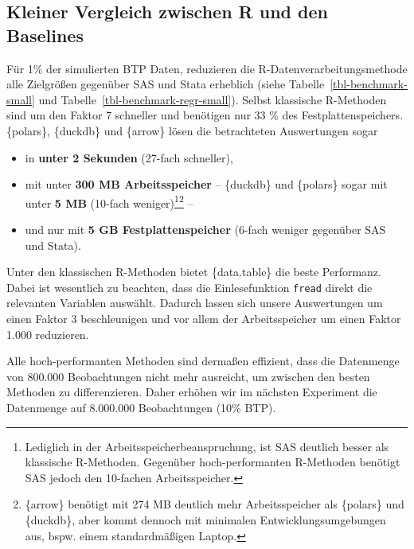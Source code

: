 \documentclass[
  german,
  10pt,
  twoside]{article}
\providecommand{\tightlist}{%
  \setlength{\itemsep}{0pt}\setlength{\parskip}{0pt}}
\let\oldref\ref
\renewcommand{\ref}[1]{\oldref{#1}\raisebox{-0.2ex}{\scriptsize\color{wistaBlue}\ding{247}}}
\begin{document}
\subsection{Kleiner Vergleich zwischen R und den
Baselines}\label{kleiner-vergleich-zwischen-r-und-den-baselines}

Für 1\% der simulierten BTP Daten, reduzieren die
R-Datenverarbeitungsmethode alle Zielgrößen gegenüber SAS und Stata
erheblich (siehe Tabelle~\ref{tbl-benchmark-small} und
Tabelle~\ref{tbl-benchmark-regr-small}). Selbst klassische R-Methoden
sind um den Faktor 7 schneller und benötigen nur 33 \% des
Festplattenspeichers. \{polars\}, \{duckdb\} und \{arrow\} lösen die
betrachteten Auswertungen sogar

\begin{itemize}
\tightlist
\item
  in \textbf{unter 2 Sekunden} (27-fach schneller),
\item
  mit unter \textbf{300 MB Arbeitsspeicher} -- \{duckdb\} und \{polars\}
  sogar mit unter \textbf{5 MB} (10-fach weniger)\footnote{Lediglich in
    der Arbeitsspeicherbeanspruchung, ist SAS deutlich besser als
    klassische R-Methoden. Gegenüber hoch-performanten R-Methoden
    benötigt SAS jedoch den 10-fachen Arbeitsspeicher.}\footnote{\{arrow\}
    benötigt mit 274 MB deutlich mehr Arbeitsspeicher als \{polars\} und
    \{duckdb\}, aber kommt dennoch mit minimalen Entwicklungsumgebungen
    aus, bspw. einem standardmäßigen Laptop.} --
\item
  und nur mit \textbf{5 GB Festplattenspeicher} (6-fach weniger
  gegenüber SAS und Stata).
\end{itemize}

Unter den klassischen R-Methoden bietet \{data.table\} die beste
Performanz. Dabei ist wesentlich zu beachten, dass die Einlesefunktion
\texttt{fread} direkt die relevanten Variablen auswählt. Dadurch lassen
sich unsere Auswertungen um einen Faktor 3 beschleunigen und vor allem
der Arbeitsspeicher um einen Faktor 1.000 reduzieren.

Alle hoch-performanten Methoden sind dermaßen effizient, dass die
Datenmenge von 800.000 Beobachtungen nicht mehr ausreicht, um zwischen
den besten Methoden zu differenzieren. Daher erhöhen wir im nächsten
Experiment die Datenmenge auf 8.000.000 Beobachtungen (10\% BTP).
\end{document}
